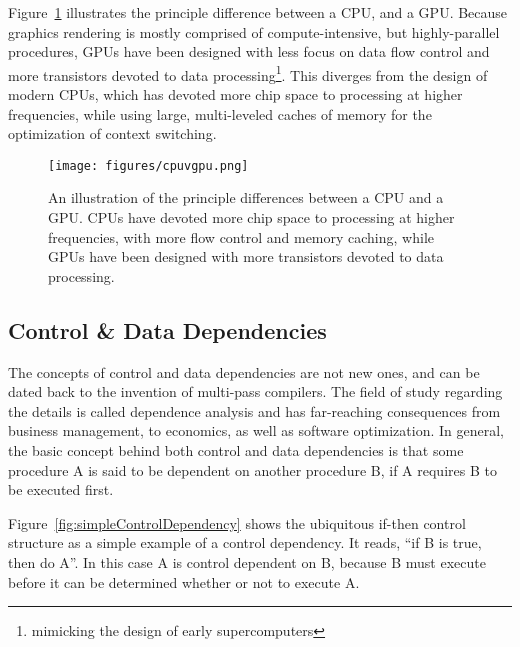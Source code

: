 Figure~\ref{fig:cpuvgpu} illustrates the principle difference between a \gls{CPU}, and a GPU. Because graphics rendering is mostly comprised of compute-intensive, but highly-parallel procedures, \glspl{GPU} have been designed with less focus on data flow control and more transistors devoted to data processing\footnote{mimicking the design of early supercomputers}. This diverges from the design of modern CPUs, which has devoted more chip space to processing at higher frequencies, while using large, multi-leveled caches of memory for the optimization of context switching.

\begin{figure}[ht]
\ffigbox
	{\texttt{[image: figures/cpuvgpu.png]}}%
	{\caption[CPU vs GPU Construction]{An illustration of the principle differences between a CPU and a GPU. CPUs have devoted more chip space to processing at higher frequencies, with more flow control and memory caching, while GPUs have been designed with more transistors devoted to data processing.}\label{fig:cpuvgpu}}
\end{figure}

%
%
%
%
\subsection{Control \& Data Dependencies}
\label{ch2sPPssCDD}

The concepts of control and data dependencies are not new ones, and can be dated back to the invention of multi-pass compilers. The field of study regarding the details is called dependence analysis and has far-reaching consequences from business management, to economics, as well as software optimization. In general, the basic concept behind both control and data dependencies is that some procedure A is said to be dependent on another procedure B, if A requires B to be executed first.

Figure~\ref{fig:simpleControlDependency} shows the ubiquitous if-then control structure as a simple example of a control dependency. It reads, ``if B is true, then do A''. In this case A is control dependent on B, because B must execute before it can be determined whether or not to execute A.

